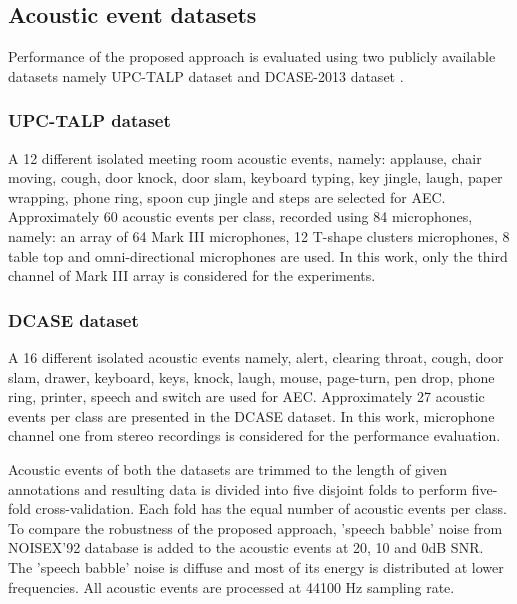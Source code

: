 \documentclass[a4paper]{article}
\begin{document}
\subsection{Acoustic event datasets}
Performance of the proposed approach is evaluated using two publicly available datasets namely UPC-TALP dataset \cite{temko2006clear} and DCASE-2013 dataset \cite{stowell2015detection}. 
\subsubsection{UPC-TALP dataset}
A 12 different isolated meeting room acoustic events, namely: applause,  chair moving, cough, door knock, door slam, keyboard typing, key jingle, laugh, paper wrapping, phone ring, spoon cup jingle and steps are selected for AEC. Approximately 60 acoustic events per class, recorded using 84 microphones, namely: an array of 64 Mark III microphones, 12 T-shape clusters microphones, 8 table top and omni-directional microphones are used. In this work, only the third channel of Mark III array is considered for the experiments. 
\subsubsection{DCASE dataset}
A 16 different isolated acoustic events namely, alert, clearing throat, cough, door slam, drawer, keyboard, keys, knock, laugh, mouse, page-turn, pen drop, phone ring, printer, speech and switch are used for AEC.  Approximately 27 acoustic events per class are presented in the DCASE dataset. In this work, microphone channel one from stereo recordings is considered for the performance evaluation.

Acoustic events of both the datasets are trimmed to the length of given annotations and resulting data is divided into five disjoint folds to perform five-fold cross-validation. Each fold has the equal number of acoustic events per class. 
To compare the robustness of the proposed approach, 'speech babble' noise from NOISEX'92 database \cite{varga1993assessment} is added to the acoustic events at 20, 10 and 0dB SNR. The 'speech babble' noise is diffuse and most of its energy is distributed at lower frequencies. All acoustic events are processed at 44100 Hz sampling rate.
\end{document}
